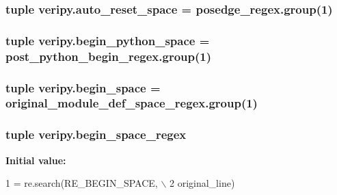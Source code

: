 \hypertarget{namespaceveripy_a756720df8d8fb83c52d7838e312cbb53}{
\subsubsection[{auto\-\_\-reset\-\_\-space}]{\setlength{\rightskip}{0pt plus 5cm}tuple veripy.\-auto\-\_\-reset\-\_\-space = posedge\-\_\-regex.\-group(1)}}\label{namespaceveripy_a756720df8d8fb83c52d7838e312cbb53}
\hypertarget{namespaceveripy_ac27b8dbb034afa7793ce50076e0b68e3}{
\subsubsection[{begin\-\_\-python\-\_\-space}]{\setlength{\rightskip}{0pt plus 5cm}tuple veripy.\-begin\-\_\-python\-\_\-space = post\-\_\-python\-\_\-begin\-\_\-regex.\-group(1)}}\label{namespaceveripy_ac27b8dbb034afa7793ce50076e0b68e3}
\hypertarget{namespaceveripy_ae247f78446c024b1e35787cb67a44b2b}{
\subsubsection[{begin\-\_\-space}]{\setlength{\rightskip}{0pt plus 5cm}tuple veripy.\-begin\-\_\-space = original\-\_\-module\-\_\-def\-\_\-space\-\_\-regex.\-group(1)}}\label{namespaceveripy_ae247f78446c024b1e35787cb67a44b2b}
\hypertarget{namespaceveripy_a1185ea61fff03e646c641f6d6caf3bdb}{
\subsubsection[{begin\-\_\-space\-\_\-regex}]{\setlength{\rightskip}{0pt plus 5cm}tuple veripy.\-begin\-\_\-space\-\_\-regex}}\label{namespaceveripy_a1185ea61fff03e646c641f6d6caf3bdb}
{\bfseries Initial value\-:}
\begin{DoxyCode}
1 = re.search(RE\_BEGIN\_SPACE, \(\backslash\)
2                                                       original\_line)
\end{DoxyCode}
